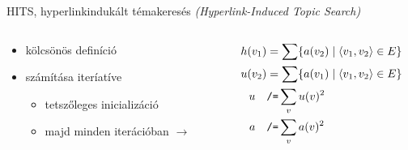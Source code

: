 \documentclass{beamer}
\newlength{\onecolwid}
\newlength{\twocolwid}
\begin{document}
\begin{frame}[t]
\begin{columns}[t]
\begin{column}{\twocolwid}
        \begin{block}{HITS, hyperlinkindukált témakeresés
          \emph{(Hyperlink-Induced Topic Search)}}
          \begin{columns}
            \begin{column}{\onecolwid}
          \begin{columns}
            \begin{column}{.5\columnwidth}
              \begin{itemize}
                \item kölcsönös definíció
                \item számítása iteríatíve 
                  \begin{itemize}
                    \item tetszőleges inicializáció
                    \item  majd minden iterációban $\rightarrow$
                  \end{itemize} \end{itemize} 
              \end{column}
            \begin{column}{.5\columnwidth}
                      \begin{align*}
                        h(v_1) &= \sum \{ a(v_2)\mid \langle v_1,v_2\rangle \in E \} \\
                        u(v_2) &= \sum \{ a(v_1)\mid \langle v_1,v_2\rangle \in E \} \\
                        u\quad &{\text{\texttt{/=}}} \sum_v u(v)^2 \\
                        a\quad &{\text{\texttt{/=}}} \sum_v a(v)^2
                      \end{align*}
            \end{column}
            \end{columns}
            \end{column}


\end{columns}
\end{block}
\end{column}
\end{columns}
\end{frame}
\end{document}
